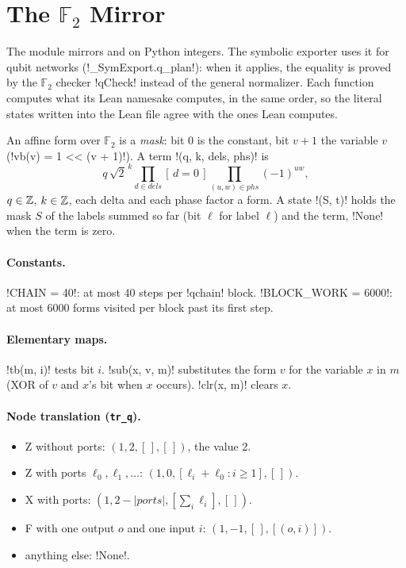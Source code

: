 {{{%
\section{The \texorpdfstring{$\mathbb{F}_2$}{F2} Mirror}\label{sec:lean-export-f2}

The module  mirrors  and
 on Python integers. The symbolic exporter uses it for
qubit networks (\lexpy!_SymExport.q_plan!): when it applies, the equality is proved by the
$\mathbb{F}_2$ checker \lexlean!qCheck! instead of the general normalizer. Each function computes
what its Lean namesake computes, in the same order, so the literal states written into the Lean
file agree with the ones Lean computes.

\begin{definition}\label{def:lean-export-f2}
An affine form over $\mathbb{F}_2$ is a \emph{mask}: bit 0 is the constant, bit $v+1$ the
variable $v$ (\lexpy!vb(v) = 1 << (v + 1)!). A term \lexpy!(q, k, dels, phs)! is
\[
  q\,\sqrt2^{\,k}\prod_{d\in\mathit{dels}}[\,d = 0\,]\prod_{(u,w)\in\mathit{phs}}(-1)^{uw},
\]
$q\in\mathbb{Z}$, $k\in\mathbb{Z}$, each delta and each phase factor a form. A state \lexpy!(S, t)! holds the mask
$S$ of the labels summed so far (bit $\ell$ for label $\ell$) and the term, \lexpy!None! when the
term is zero.
\end{definition}

\paragraph{Constants.} \lexpy!CHAIN = 40!: at most 40 steps per \lexlean!qchain! block.
\lexpy!BLOCK_WORK = 6000!: at most 6000 forms visited per block past its first step.

\paragraph{Elementary maps.} \lexpy!tb(m, i)! tests bit $i$. \lexpy!sub(x, v, m)! substitutes the form
$v$ for the variable $x$ in $m$ (XOR of $v$ and $x$'s bit when $x$ occurs). \lexpy!clr(x, m)! clears
$x$.

\paragraph{Node translation (\texttt{tr\_q}).}
\begin{itemize}
\item Z without ports: $(1, 2, [\,], [\,])$, the value 2.
\item Z with ports $\ell_0, \ell_1, \ldots$: $(1, 0, [\ell_i + \ell_0 : i\ge1], [\,])$.
\item X with ports: $(1, 2-|\mathit{ports}|, [\sum_i \ell_i], [\,])$.
\item F with one output $o$ and one input $i$: $(1, -1, [\,], [(o, i)])$.
\item anything else: \lexpy!None!.
\end{itemize}

}}}

